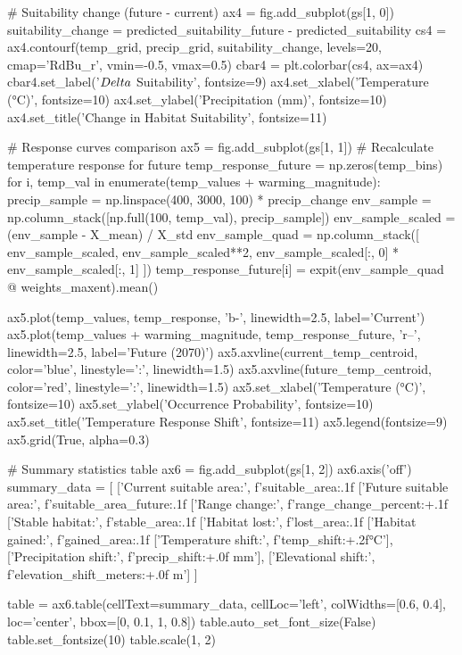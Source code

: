 \documentclass[11pt,a4paper]{article}
\begin{document}
\begin{pycode}
# Suitability change (future - current)
ax4 = fig.add_subplot(gs[1, 0])
suitability_change = predicted_suitability_future - predicted_suitability
cs4 = ax4.contourf(temp_grid, precip_grid, suitability_change,
                  levels=20, cmap='RdBu_r', vmin=-0.5, vmax=0.5)
cbar4 = plt.colorbar(cs4, ax=ax4)
cbar4.set_label('$\\Delta$ Suitability', fontsize=9)
ax4.set_xlabel('Temperature (°C)', fontsize=10)
ax4.set_ylabel('Precipitation (mm)', fontsize=10)
ax4.set_title('Change in Habitat Suitability', fontsize=11)

# Response curves comparison
ax5 = fig.add_subplot(gs[1, 1])
# Recalculate temperature response for future
temp_response_future = np.zeros(temp_bins)
for i, temp_val in enumerate(temp_values + warming_magnitude):
    precip_sample = np.linspace(400, 3000, 100) * precip_change
    env_sample = np.column_stack([np.full(100, temp_val), precip_sample])
    env_sample_scaled = (env_sample - X_mean) / X_std
    env_sample_quad = np.column_stack([
        env_sample_scaled, env_sample_scaled**2,
        env_sample_scaled[:, 0] * env_sample_scaled[:, 1]
    ])
    temp_response_future[i] = expit(env_sample_quad @ weights_maxent).mean()

ax5.plot(temp_values, temp_response, 'b-', linewidth=2.5, label='Current')
ax5.plot(temp_values + warming_magnitude, temp_response_future, 'r--',
        linewidth=2.5, label='Future (2070)')
ax5.axvline(current_temp_centroid, color='blue', linestyle=':', linewidth=1.5)
ax5.axvline(future_temp_centroid, color='red', linestyle=':', linewidth=1.5)
ax5.set_xlabel('Temperature (°C)', fontsize=10)
ax5.set_ylabel('Occurrence Probability', fontsize=10)
ax5.set_title('Temperature Response Shift', fontsize=11)
ax5.legend(fontsize=9)
ax5.grid(True, alpha=0.3)

# Summary statistics table
ax6 = fig.add_subplot(gs[1, 2])
ax6.axis('off')
summary_data = [
    ['Current suitable area:', f'{suitable_area:.1f}%
    ['Future suitable area:', f'{suitable_area_future:.1f}%
    ['Range change:', f'{range_change_percent:+.1f}%
    ['Stable habitat:', f'{stable_area:.1f}%
    ['Habitat lost:', f'{lost_area:.1f}%
    ['Habitat gained:', f'{gained_area:.1f}%
    ['Temperature shift:', f'{temp_shift:+.2f}°C'],
    ['Precipitation shift:', f'{precip_shift:+.0f} mm'],
    ['Elevational shift:', f'{elevation_shift_meters:+.0f} m']
]

table = ax6.table(cellText=summary_data, cellLoc='left',
                 colWidths=[0.6, 0.4], loc='center',
                 bbox=[0, 0.1, 1, 0.8])
table.auto_set_font_size(False)
table.set_fontsize(10)
table.scale(1, 2)


\end{pycode}
\end{document}
